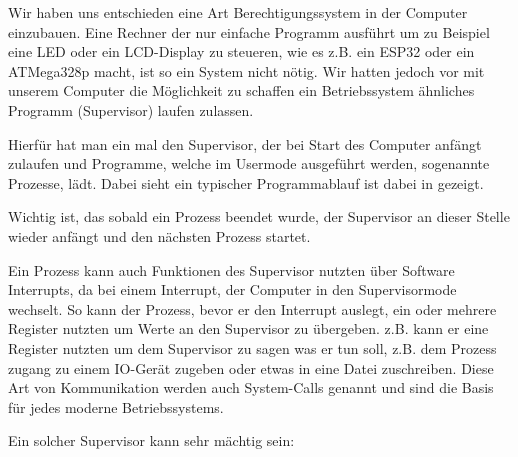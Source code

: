 \documentclass{scrartcl}
\begin{document}
    Wir haben uns entschieden eine Art Berechtigungssystem in der Computer einzubauen.
    Eine Rechner der nur einfache Programm ausführt um zu Beispiel eine LED oder ein LCD-Display zu steueren, wie es z.B. ein ESP32 oder ein ATMega328p macht, ist so ein System nicht nötig.
    Wir hatten jedoch vor mit unserem Computer die Möglichkeit zu schaffen ein Betriebssystem ähnliches Programm (Supervisor) laufen zulassen.

    Hierfür hat man ein mal den Supervisor, der bei Start des Computer anfängt zulaufen und Programme, welche im Usermode ausgeführt werden, sogenannte Prozesse, lädt.
    Dabei sieht ein typischer Programmablauf ist dabei in gezeigt.

    Wichtig ist, das sobald ein Prozess beendet wurde, der Supervisor an dieser Stelle wieder anfängt und den nächsten Prozess startet.

    Ein Prozess kann auch Funktionen des Supervisor nutzten über Software Interrupts, da bei einem Interrupt, der Computer in den Supervisormode wechselt.
    So kann der Prozess, bevor er den Interrupt auslegt, ein oder mehrere Register nutzten um Werte an den Supervisor zu übergeben.
    z.B. kann er eine Register nutzten um dem Supervisor zu sagen was er tun soll, z.B. dem Prozess zugang zu einem IO-Gerät zugeben oder etwas in eine Datei zuschreiben.
    Diese Art von Kommunikation werden auch System-Calls genannt und sind die Basis für jedes moderne Betriebssystems.

    Ein solcher Supervisor kann sehr mächtig sein:
\end{document}
